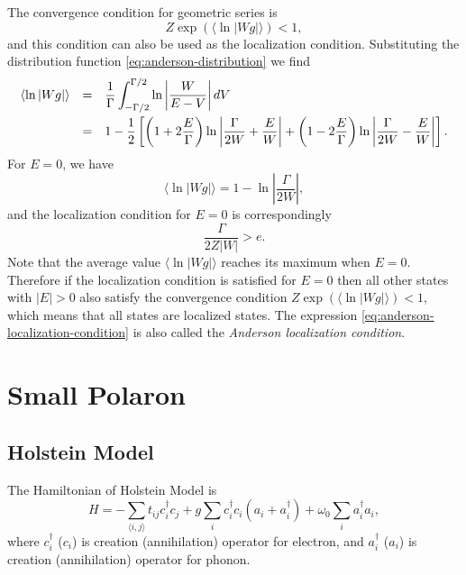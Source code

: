 \documentclass{book}
\newcommand{\average}[1]{\langle#1\rangle}
\numberwithin{equation}{section}
\begin{document}
The convergence condition for geometric series is 
\begin{equation}
  Z\exp(\average{\ln|Wg|})<1,
\end{equation}
and this condition can also be used as the localization condition.
Substituting the distribution function
\eqref{eq:anderson-distribution} we find
\begin{equation}
  \begin{array}{rcl}
    \average{\ln|Wg|}&=&\displaystyle\frac{1}{\Gamma}\int_{-\Gamma/2}^{\Gamma/2}\ln
    \left|\frac{W}{E-V}\right|dV\\\vbox to 18pt{}
    &=&\displaystyle 1-\frac{1}{2}\left[\left(1+2\frac{E}{\Gamma}\right)\ln
      \left|\frac{\Gamma}{2W}+\frac{E}{W}\right|+
      \left(1-2\frac{E}{\Gamma}\right)\ln
      \left|\frac{\Gamma}{2W}-\frac{E}{W}\right|
    \right].
\end{array}
\end{equation}
For $E=0$, we have
\begin{equation}
  \average{\ln|Wg|}=1-\ln\left|\frac{\Gamma}{2W}\right|,
\end{equation}
and the localization condition for $E=0$ is correspondingly
\begin{equation}
  \label{eq:anderson-localization-condition}
  \frac{\Gamma}{2Z|W|}>e.
\end{equation}
Note that the average value $\average{\ln|Wg|}$ reaches its maximum
when $E=0$. Therefore if the localization condition is satisfied for
$E=0$ then all other states with $|E|>0$ also satisfy the convergence
condition $Z\exp(\average{\ln|Wg|})<1$, which means that all states
are localized states. The expression
\eqref{eq:anderson-localization-condition} is also called the
\textit{Anderson localization condition}.



\chapter{Small Polaron}
\section{Holstein Model}
The Hamiltonian of Holstein Model is
\begin{equation}
  H=-\sum_{\langle{i,j}\rangle}t_{ij}c_i^\dag c_j+g\sum_ic_i^\dag c_i(a_i+a_i^\dag)
  +\omega_0\sum_ia_i^\dag a_i,
  \label{Holstein}
\end{equation}
where $c_i^\dag$ ($c_i$) is creation (annihilation) operator for electron, and
$a_i^\dag$ ($a_i$) is creation (annihilation) operator for phonon.
\end{document}
